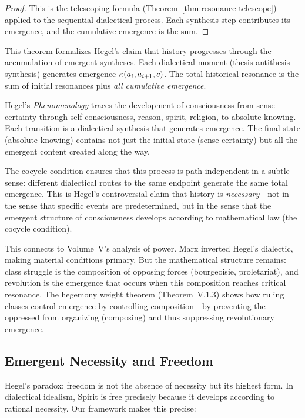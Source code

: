 \begin{proof}
This is the telescoping formula (Theorem~\ref{thm:resonance-telescope}) applied
to the sequential dialectical process. Each synthesis step contributes its
emergence, and the cumulative emergence is the sum.
\end{proof}

\begin{interpretation}
This theorem formalizes Hegel's claim that history progresses through the
accumulation of emergent syntheses. Each dialectical moment (thesis-antithesis-synthesis)
generates emergence $\kappa(a_i, a_{i+1}, c)$. The total historical resonance
is the sum of initial resonances plus \emph{all cumulative emergence}.

Hegel's \emph{Phenomenology} traces the development of consciousness from
sense-certainty through self-consciousness, reason, spirit, religion, to
absolute knowing. Each transition is a dialectical synthesis that generates
emergence. The final state (absolute knowing) contains not just the initial
state (sense-certainty) but all the emergent content created along the way.

The cocycle condition ensures that this process is path-independent in a
subtle sense: different dialectical routes to the same endpoint generate the
same total emergence. This is Hegel's controversial claim that history is
\emph{necessary}---not in the sense that specific events are predetermined,
but in the sense that the emergent structure of consciousness develops according
to mathematical law (the cocycle condition).

This connects to Volume~V's analysis of power. Marx inverted Hegel's dialectic,
making material conditions primary. But the mathematical structure remains:
class struggle is the composition of opposing forces (bourgeoisie, proletariat),
and revolution is the emergence that occurs when this composition reaches
critical resonance. The hegemony weight theorem (Theorem~V.1.3) shows how
ruling classes control emergence by controlling composition---by preventing
the oppressed from organizing (composing) and thus suppressing revolutionary
emergence.
\end{interpretation}

\subsection{Emergent Necessity and Freedom}

Hegel's paradox: freedom is not the absence of necessity but its highest form.
In dialectical idealism, Spirit is free precisely because it develops according
to rational necessity. Our framework makes this precise:

